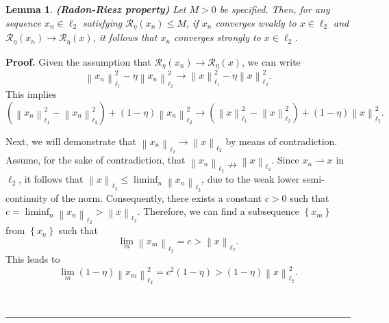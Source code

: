 \documentclass[a4paper,12pt]{article}
\newtheorem{lemma}[theorem]{Lemma}
\numberwithin{equation}{section}
\newenvironment{proof}[1][Proof]{\textbf{#1.} }
{\ \rule{0.75em}{0.75em}\smallskip}
\begin{document}
\begin{lemma}\label{lem2.9}
    \textbf{(Radon-Riesz property)} Let $M>0$ be specified. Then, for any sequence $x_{n}\in\ell_{2}$ satisfying $\mathcal{R}_{\eta}\left(x_{n}\right)\leq M$, if $x_{n}$ converges weakly to $x\in\ell_{2}$ and $\mathcal{R}_{\eta}\left(x_{n}\right)\rightarrow \mathcal{R}_{\eta}\left(x\right)$, it follows that $x_{n}$ converges strongly to $x\in\ell_{2}$.  
\end{lemma}

\begin{proof}
    Given the assumption that $\mathcal{R}_{\eta}(x_{n})\rightarrow \mathcal{R}_{\eta}(x)$, we can write
    \begin{equation*}
        \left\|x_{n}\right\|_{\ell_{1}}^{2}-\eta\left\|x_{n}\right\|_{\ell_{2}}^{2} \rightarrow\left\|x\right\|_{\ell_{1}}^{2}-\eta\left\|x\right\|_{\ell_{2}}^{2}.
    \end{equation*}
    This implies
    \begin{equation}\label{equ2.8}
        \left(\left\|x_{n}\right\|_{\ell_{1}}^{2}-\left\|x_{n}\right\|_{\ell_{2}}^{2} \right)+\left(1-\eta\right)\left\|x_{n}\right\|_{\ell_{2}}^{2} \rightarrow \left(\left\|x\right\|_{\ell_{1}}^{2}-\left\|x\right\|_{\ell_{2}}^{2} \right)+\left(1-\eta\right)\left\|x\right\|_{\ell_{2}}^{2}.
    \end{equation}
    \par Next, we will demonstrate that $\left\|x_{n}\right\|_{\ell_{2}}\rightarrow \left\|x\right\|_{\ell_{2}}$ by means of contradiction. Assume, for the sake of contradiction, that $\left\|x_{n}\right\|_{\ell_{2}}\nrightarrow \left\|x\right\|_{\ell_{2}}$. Since $x_{n}\rightharpoonup x$ in $\ell_{2}$, it follows that $\left\|x\right\|_{\ell_{2}}\leq \liminf_{n}\left\|x_{n}\right\|_{\ell_{2}}$, due to the weak lower semi-continuity of the norm. Consequently, there exists a constant $c>0$ such that $c=\liminf_{n}\left\|x_{n}\right\|_{\ell_{2}}>\left\|x\right\|_{\ell_{2}}$. Therefore, we can find a subsequence $\left\{x_{m}\right\}$ from $\left\{x_{n}\right\}$ such that
    \begin{equation*}
        \lim_{m}\left\|x_{m}\right\|_{\ell_{2}}=c>\left\|x\right\|_{\ell_{2}}.
    \end{equation*}
    This leads to
    \begin{equation}\label{equ2.9}
        \lim_{m}\left(1-\eta\right)\left\|x_{m}\right\|_{\ell_{2}}^{2} = c^{2}\left(1-\eta\right)>\left(1-\eta\right)\left\|x\right\|_{\ell_{2}}^{2}.
    \end{equation}

\end{proof}
\end{document}
